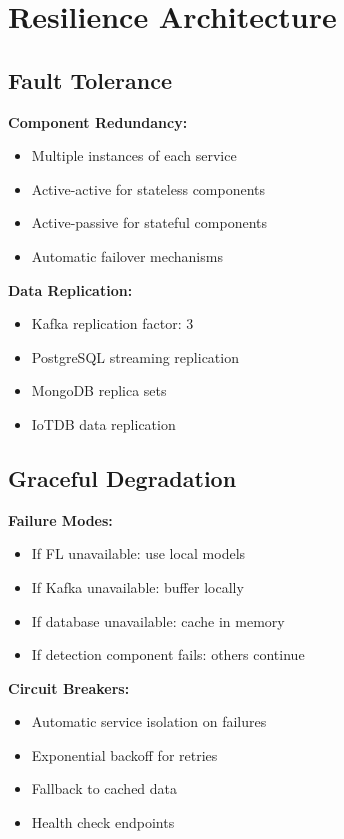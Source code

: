 \documentclass[12pt,a4paper]{article}
\begin{document}
\section{Resilience Architecture}

\subsection{Fault Tolerance}

\textbf{Component Redundancy:}
\begin{itemize}[leftmargin=1cm,itemsep=0pt]
    \item Multiple instances of each service
    \item Active-active for stateless components
    \item Active-passive for stateful components
    \item Automatic failover mechanisms
\end{itemize}

\textbf{Data Replication:}
\begin{itemize}[leftmargin=1cm,itemsep=0pt]
    \item Kafka replication factor: 3
    \item PostgreSQL streaming replication
    \item MongoDB replica sets
    \item IoTDB data replication
\end{itemize}

\subsection{Graceful Degradation}

\textbf{Failure Modes:}
\begin{itemize}[leftmargin=1cm,itemsep=0pt]
    \item If FL unavailable: use local models
    \item If Kafka unavailable: buffer locally
    \item If database unavailable: cache in memory
    \item If detection component fails: others continue
\end{itemize}

\textbf{Circuit Breakers:}
\begin{itemize}[leftmargin=1cm,itemsep=0pt]
    \item Automatic service isolation on failures
    \item Exponential backoff for retries
    \item Fallback to cached data
    \item Health check endpoints
\end{itemize}
\end{document}
